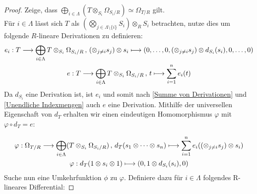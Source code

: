 \documentclass[10pt,a4paper]{report}
\newcommand{\comment}[1]{}
\newcommand{\functionback}[3]{\nolinebreak{#1:#2 \longmapsto #3}}
\newcommand{\function}[5]{\nolinebreak{#1:#2 \longrightarrow #3 \, , \, #4 \longmapsto #5}}
\newcommand{\divR}[2]{\Omega_{#1/#2}}
\newcommand{\divf}[1]{d_{#1}}
\newcommand{\Tensor}[3]{#1 \otimes_{#2} #3}
\newcommand{\tensor}[3]{#1 \otimes #3}
\begin{document}
\begin{proof} Zeige, dass $\bigoplus_{i\in \Lambda} ( \Tensor{T}{S_i}{\divR{S_i}{R}}) \simeq \divR{T}{R}$ gilt.\\
Für $i \in \Lambda$ lässt sich  $T$ als $\Tensor{\left(\bigotimes_{j \in \Lambda \setminus \lbrace i \rbrace} S_i \right)}{R}{S_i}$ betrachten, nutze dies um folgende $R$-lineare Derivationen zu definieren:
\begin{gather*}
\comment{
\function{e_i}{T}{\bigoplus_{i \in \Lambda} \Tensor{T}{S_i}{\divR{S_i}{R}}}{\tensor{(\otimes_{j \neq i} s_j)}{R}{s_i}}{(0,\dots,0,\tensor{(\otimes_{j \neq i} s_j)}{R}{d_{S_i}(s_i)},0,\dots,0)} \\
\function{e}{T}{\bigoplus_{i \in \Lambda} \Tensor{T}{S_i}{\divR{S_i}{R}}}{\tensor{(\otimes_{j \neq i} s_j)}{R}{s_i}}{\sum_{i = 1}^n e_i(\tensor{(\otimes_{j \neq i} s_j)}{R}{s_i})}
}
\function{e_i}{T}{\bigoplus_{i \in \Lambda} \Tensor{T}{S_i}{\divR{S_i}{R}}}{\tensor{(\otimes_{j \neq i} s_j)}{R}{s_i}}{(0,\dots,0,\tensor{(\otimes_{j \neq i} s_j)}{R}{d_{S_i}(s_i)},0,\dots,0)} \\
\function{e}{T}{\bigoplus_{i \in \Lambda} \Tensor{T}{S_i}{\divR{S_i}{R}}}{t}{\sum_{i = 1}^n e_i(t)}
\end{gather*}
Da $\divf{S_i}$ eine Derivation ist, ist $e_i$ und somit nach \cref{Summe von Derivationen} und \cref{Unendliche Indexmengen} auch $e$ eine Derivation. Mithilfe der universellen Eigenschaft von $\divf{T}$ erhalten wir einen eindeutigen Homomorphismus $\varphi$ mit $\varphi \circ \divf{T} = e$:
\comment{
\begin{center}
\begin{tikzcd}
T \arrow[rd, "e"'] \arrow[r, "\divf{T}"] & \divR{T}{R} \arrow[d, "\exists ! \varphi", dashed] \\
                                    & \bigoplus_{i\in \Lambda} \Tensor{T}{S_i}{\divR{S_i}{R}}                                       
\end{tikzcd}
\end{center}
}
\begin{gather*}
\function{\varphi}{\divR{T}{R}}{\bigoplus_{i\in \Lambda}(\Tensor{T}{S_i}{\divR{S_i}{R}})}{\divf{T}(s_1 \otimes \dots \otimes s_n)}{\sum_{i = 1}^n e_i(\tensor{(\otimes_{j \neq i} s_j)}{R}{s_i})}\\
\functionback{\varphi}{\divf{T}(1 \otimes s_i \otimes 1)}{(0,\tensor{1}{S_i}{d_{S_i}(s_i)},0)}
\end{gather*}
Suche nun eine Umkehrfunktion $\phi$ zu $\varphi$. Definiere dazu für $i \in \Lambda$ folgendes R-lineares Differential:

\end{proof}
\end{document}
